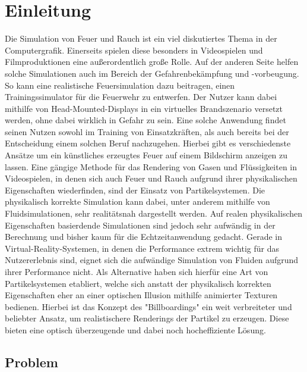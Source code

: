 \section{Einleitung}
\noindent
Die Simulation von Feuer und Rauch ist ein viel diskutiertes Thema in der Computergrafik. Einerseits
spielen diese besonders in Videospielen und Filmproduktionen eine außerordentlich große Rolle. Auf der
anderen Seite helfen solche Simulationen auch im Bereich der Gefahrenbekämpfung und -vorbeugung.
So kann eine realistische Feuersimulation dazu beitragen, einen Trainingssimulator für die Feuerwehr zu
entwerfen. Der Nutzer kann dabei mithilfe von Head-Mounted-Displays in ein virtuelles Brandszenario versetzt werden,
ohne dabei wirklich in Gefahr zu sein. Eine solche Anwendung findet seinen Nutzen sowohl im Training
von Einsatzkräften, als auch bereits bei der Entscheidung einem solchen Beruf nachzugehen.
Hierbei gibt es verschiedenste Ansätze um ein künstliches erzeugtes Feuer auf einem
Bildschirm anzeigen zu lassen. Eine gängige Methode für das Rendering von Gasen und Flüssigkeiten
in Videospielen, in denen sich auch Feuer und Rauch aufgrund ihrer physikalischen Eigenschaften
wiederfinden, sind der Einsatz von Partikelsystemen. Die physikalisch korrekte Simulation kann dabei,
unter anderem mithilfe von Fluidsimulationen, sehr realitätsnah dargestellt werden.
Auf realen physikalischen Eigenschaften basierdende Simulationen sind jedoch sehr aufwändig in der
Berechnung und bisher kaum für die Echtzeitanwendung gedacht.
Gerade in Virtual-Reality-Systemen, in denen die Performance extrem wichtig für das Nutzererlebnis sind,
eignet sich die aufwändige Simulation von Fluiden aufgrund ihrer Performance nicht. Als Alternative haben
sich hierfür eine Art von Partikelsystemen etabliert, welche sich anstatt der physikalisch korrekten
Eigenschaften eher an einer optischen Illusion mithilfe animierter Texturen bedienen.
Hierbei ist das Konzept des "Billboardings" ein weit verbreiteter und beliebter Ansatz,
um realistischere Renderings der Partikel zu erzeugen. Diese bieten eine optisch überzeugende und
dabei noch hocheffiziente Lösung.



\subsection{Problem}


